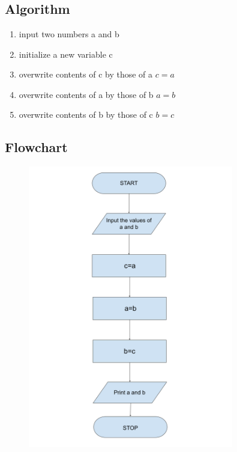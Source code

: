 \documentclass[12pt]{article}
\begin{document}
\section{}
\subsection{Algorithm}
\begin{enumerate}
    \item input two numbers a and b
    \item initialize a new variable c
    \item overwrite contents of c by those of a $c = a$
    \item overwrite contents of a by those of b $a = b$
    \item overwrite contents of b by those of c $b = c$
\end{enumerate}
\subsection{Flowchart}
\begin{figure}[h]
    \centering
    \includegraphics[width=0.8\textwidth]{Flowchart10.png}
\end{figure}
\newpage
\end{document}
